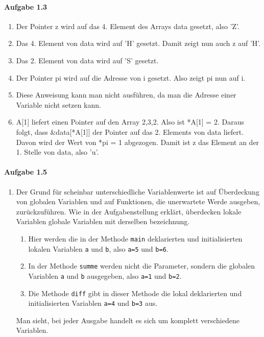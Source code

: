 \documentclass[11pt]{article}
\begin{document}
\paragraph{Aufgabe 1.3}
\begin{enumerate}[label=\alph*)]
\item Der Pointer z wird auf das 4. Element des Arrays data gesetzt, also 'Z'.

\item Das 4. Element von data wird auf 'H' gesetzt. Damit zeigt nun auch z auf 'H'.

\item Das 2. Element von data wird auf 'S' gesetzt.

\item Der Pointer pi wird auf die Adresse von i gesetzt. Also zeigt pi nun auf i.

\item Diese Anweisung kann man nicht ausführen, da man die Adresse einer Variable nicht setzen kann.

\item A[1] liefert einen Pointer auf den Array {2,3,2}. Also ist *A[1] = 2. Daraus folgt, dass \&data[*A[1]] der Pointer auf das 2. Elements von data liefert. Davon wird der Wert von *pi = 1 abgezogen. Damit ist z das Element an der 1. Stelle von data, also 'u'.

\end{enumerate} 

\paragraph{Aufgabe 1.5}
\begin{enumerate}[label=\alph*)]
\item Der Grund für scheinbar unterschiedliche Variablenwerte ist auf Überdeckung von globalen Variablen und auf Funktionen, die unerwartete Werde ausgeben, zurückzuführen. Wie in der Aufgabenstellung erklärt, überdecken lokale Variablen globale Variablen mit derselben bezeichnung.
	\begin{enumerate}[label=Zeile \arabic*:]
		\item 	Hier werden die in der Methode \verb|main| deklarierten und initialisierten lokalen Variablen \verb|a| und \verb|b|, also \verb|a=5| und \verb|b=6|.
		\item	In der Methode \verb|summe| werden nicht die Parameter, sondern die globalen Variablen \verb|a| und \verb|b| ausgegeben, also \verb|a=1| und \verb|b=2|.
		\item	Die Methode \verb|diff| gibt in dieser Methode die lokal deklarierten und initialisierten Variablen \verb|a=4| und \verb|b=3| aus.
	\end{enumerate}
	Man sieht, bei jeder Ausgabe handelt es sich um komplett verschiedene Variablen.
\end{enumerate}
\end{document}
